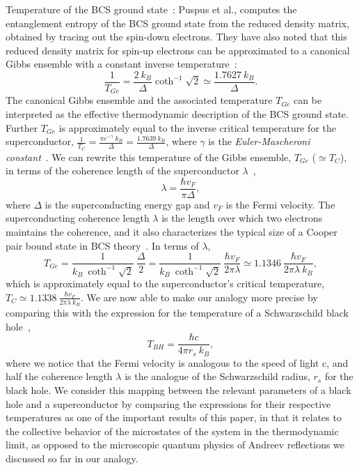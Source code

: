 \documentclass[12pt,letterpaper,aps,onecolumn,superscriptaddress,floatfix,notitlepage]{revtex4-1}
\begin{document}
	Temperature of the BCS ground state~\cite{puspus2014entanglement}: Puspus et al., computes the entanglement entropy of the BCS ground state from the reduced density matrix, obtained by tracing out the spin-down electrons. They have also noted that this reduced density matrix for spin-up electrons can be approximated to a canonical Gibbs ensemble with a constant inverse temperature~\cite{puspus2014entanglement}:
	\begin{equation}
	\label{Tge}
	\frac{1}{T_{Ge}} =\frac{2~k_{B}}{\Delta}\coth^{-1}\sqrt{2}\simeq\frac{1.7627~k_{B}}{\Delta}.
	\end{equation}
	The canonical Gibbs ensemble and the associated temperature $T_{Ge}$ can be interpreted as the effective thermodynamic description of the BCS ground state. 
	Further $T_{Ge}$ is approximately equal to the inverse critical temperature for the superconductor, $\frac{1}{T_{C}} = \frac{\pi e^{-\gamma}~k_{B}}{\Delta} = \frac{1.7639~k_{B}}{\Delta}$, where $\gamma$ is the \textit{Euler-Mascheroni constant}~\cite{puspus2014entanglement}.  We can rewrite this temperature of the Gibbs ensemble, $T_{Ge}$ ($\simeq T_{C}$), in terms of the coherence length of the superconductor $\lambda$~\cite{annett2004superconductivity}, 
	\begin{equation}
	\lambda = \frac{\hbar v_{F}}{\pi\Delta},
	\end{equation}
	where $\Delta$ is the superconducting energy gap and $v_{F}$ is the Fermi velocity. The superconducting coherence length $\lambda$ is the length over which two electrons maintains the coherence, and it also characterizes the typical size of a Cooper pair bound state in BCS theory~\cite{annett2004superconductivity}. In terms of $\lambda$,   
	\begin{equation}
	T_{Ge} = \frac{1}{k_{B}~\coth^{-1}\sqrt{2}}~\frac{\Delta}{2} = \frac{1}{k_{B}~\coth^{-1}\sqrt{2}}~\frac{\hbar v_{F}}{2\pi\lambda}\simeq 1.1346~ \frac{\hbar v_{F}}{2\pi\lambda~k_{B}}, 
	\end{equation} which is approximately equal to the superconductor's critical temperature,
	$T_{C} \simeq 1.1338~ \frac{\hbar v_{F}}{2\pi\lambda~k_{B}}.$ We are now able to make our analogy more precise by comparing this with the expression for the temperature of a Schwarzschild black hole~\cite{temp,temp2,temp3}, 
	\begin{equation}\label{bhT}T_{BH} =\frac{\hbar c}{4\pi r_{s}~k_{B}},\end{equation}
	where we notice that the Fermi velocity is analogous to the speed of light c, and half the coherence length $\lambda$ is the analogue of the Schwarzschild radius, $r_{s}$ for the black hole. We consider this mapping between the relevant parameters of a black hole and a superconductor by comparing the expressions for their respective temperatures as one of the important results of this paper, in that it relates to the collective behavior of the microstates of the system in the thermodynamic limit, as opposed to  the microscopic quantum physics of Andreev reflections we discussed so far in our analogy.     
\end{document}
